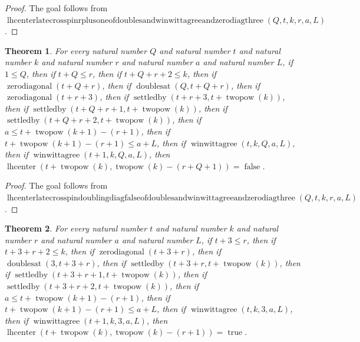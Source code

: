 \documentclass[11pt]{article}
\newtheorem{theorem}{Theorem}[section]
\theoremstyle{definition}
\begin{document}
\begin{proof}
The goal follows from \(\operatorname{lhcenterlatecrosspinrplusoneofdoublesandwinwittagreeandzerodiagthree}(Q, t, k, r, a, L)\).
\end{proof}
\begin{theorem}
\label{ll:paper:lhcenter-late-cross-pin-doubling-diag-false-of-doubles-and-winwittagree-and-zero-diag-three}
For every natural number \(Q\) and natural number \(t\) and natural number \(k\) and natural number \(r\) and natural number \(a\) and natural number \(L\), if \(1 \le Q\), then if \(t + Q \le r\), then if \(t + Q + r + 2 \le k\), then if \(\operatorname{zerodiagonal}(t + Q + r)\), then if \(\operatorname{doublesat}(Q, t + Q + r)\), then if \(\operatorname{zerodiagonal}(t + r + 3)\), then if \(\operatorname{settledby}(t + r + 3, t + \operatorname{twopow}(k))\), then if \(\operatorname{settledby}(t + Q + r + 1, t + \operatorname{twopow}(k))\), then if \(\operatorname{settledby}(t + Q + r + 2, t + \operatorname{twopow}(k))\), then if \(a \le t + \operatorname{twopow}(k + 1) - (r + 1)\), then if \(t + \operatorname{twopow}(k + 1) - (r + 1) \le a + L\), then if \(\operatorname{winwittagree}(t, k, Q, a, L)\), then if \(\operatorname{winwittagree}(t + 1, k, Q, a, L)\), then \(\operatorname{lhcenter}(t + \operatorname{twopow}(k), \operatorname{twopow}(k) - (r + Q + 1)) = \operatorname{false}\).
\end{theorem}
\begin{proof}
The goal follows from \(\operatorname{lhcenterlatecrosspindoublingdiagfalseofdoublesandwinwittagreeandzerodiagthree}(Q, t, k, r, a, L)\).
\end{proof}
\begin{theorem}
\label{ll:paper:lhcenter-late-cross-pin-before-zero-diag-of-doubles-three-and-winwittagree}
For every natural number \(t\) and natural number \(k\) and natural number \(r\) and natural number \(a\) and natural number \(L\), if \(t + 3 \le r\), then if \(t + 3 + r + 2 \le k\), then if \(\operatorname{zerodiagonal}(t + 3 + r)\), then if \(\operatorname{doublesat}(3, t + 3 + r)\), then if \(\operatorname{settledby}(t + 3 + r, t + \operatorname{twopow}(k))\), then if \(\operatorname{settledby}(t + 3 + r + 1, t + \operatorname{twopow}(k))\), then if \(\operatorname{settledby}(t + 3 + r + 2, t + \operatorname{twopow}(k))\), then if \(a \le t + \operatorname{twopow}(k + 1) - (r + 1)\), then if \(t + \operatorname{twopow}(k + 1) - (r + 1) \le a + L\), then if \(\operatorname{winwittagree}(t, k, 3, a, L)\), then if \(\operatorname{winwittagree}(t + 1, k, 3, a, L)\), then \(\operatorname{lhcenter}(t + \operatorname{twopow}(k), \operatorname{twopow}(k) - (r + 1)) = \operatorname{true}\).
\end{theorem}
\end{document}
